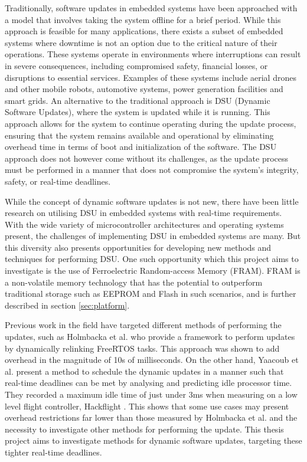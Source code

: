 Traditionally, software updates in embedded systems have been approached with a model that involves taking the system offline for a brief period. While this approach is feasible for many applications, there exists a subset of embedded systems where downtime is not an option due to the critical nature of their operations. These systems operate in environments where interruptions can result in severe consequences, including compromised safety, financial losses, or disruptions to essential services. Examples of these systems include aerial drones and other mobile robots, automotive systems, power generation facilities and smart grids. An alternative to the traditional approach is DSU (Dynamic Software Updates), where the system is updated while it is running. This approach allows for the system to continue operating during the update process, ensuring that the system remains available and operational by eliminating overhead time in terms of boot and initialization of the software. The DSU approach does not however come without its challenges, as the update process must be performed in a manner that does not compromise the system's integrity, safety, or real-time deadlines.

While the concept of dynamic software updates is not new, there have been little research on utilising DSU in embedded systems with real-time requirements. With the wide variety of microcontroller architectures and operating systems present, the challenges of implementing DSU in embedded systems are many. But this diversity also presents opportunities for developing new methods and techniques for performing DSU. One such opportunity which this project aims to investigate is the use of Ferroelectric Random-access Memory (FRAM). FRAM is a non-volatile memory technology that has the potential to outperform traditional storage such as EEPROM and Flash in such scenarios, and is further described in section \ref{sec:platform}.

Previous work in the field have targeted different methods of performing the updates, such as Holmbacka et al. \cite{dynUpdateFramework} who provide a framework to perform updates by dynamically relinking FreeRTOS tasks. This approach was shown to add overhead in the magnitude of 10s of milliseconds. On the other hand, Yaacoub et al. \cite{NeRTA} present a method to schedule the dynamic updates in a manner such that real-time deadlines can be met by analysing and predicting idle processor time. They recorded a maximum idle time of just under 3ms when measuring on a low level flight controller, Hackflight \cite{hackflight}. This shows that some use cases may present overhead restrictions far lower than those measured by Holmbacka et al. and the necessity to investigate other methods for performing the update. This thesis project aims to investigate methods for dynamic software updates, targeting these tighter real-time deadlines.  